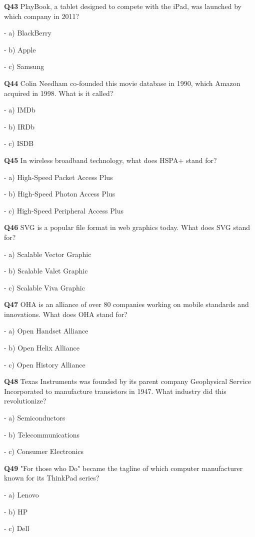 \textbf{Q43} PlayBook, a tablet designed to compete with the iPad, was launched by which company in 2011?\par
\quad - a) BlackBerry\par
\quad - b) Apple\par
\quad - c) Samsung\par

\textbf{Q44} Colin Needham co‑founded this movie database in 1990, which Amazon acquired in 1998. What is it called?\par
\quad - a) IMDb\par
\quad - b) IRDb\par
\quad - c) ISDB\par

\textbf{Q45} In wireless broadband technology, what does HSPA+ stand for?\par
\quad - a) High‑Speed Packet Access Plus\par
\quad - b) High‑Speed Photon Access Plus\par
\quad - c) High‑Speed Peripheral Access Plus\par

\textbf{Q46} SVG is a popular file format in web graphics today. What does SVG stand for?\par
\quad - a) Scalable Vector Graphic\par
\quad - b) Scalable Valet Graphic\par
\quad - c) Scalable Viva Graphic\par

\textbf{Q47} OHA is an alliance of over 80 companies working on mobile standards and innovations. What does OHA stand for?\par
\quad - a) Open Handset Alliance\par
\quad - b) Open Helix Alliance\par
\quad - c) Open History Alliance\par

\textbf{Q48} Texas Instruments was founded by its parent company Geophysical Service Incorporated to manufacture transistors in 1947. What industry did this revolutionize?\par
\quad - a) Semiconductors\par
\quad - b) Telecommunications\par
\quad - c) Consumer Electronics\par

\textbf{Q49} "For those who Do" became the tagline of which computer manufacturer known for its ThinkPad series?\par
\quad - a) Lenovo\par
\quad - b) HP\par
\quad - c) Dell\par


